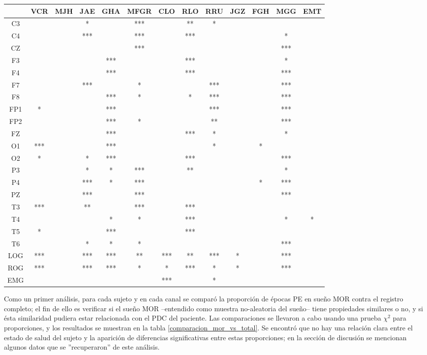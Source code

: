 \begin{SidewaysFigure}
\centering
\begin{tabular}{c||ccccc||cccc||ccc}
&VCR&MJH&JAE&GHA&MFGR&CLO&RLO&RRU&JGZ&FGH&MGG&EMT \\
\hline
C3& & &*& &***& &**&*& & & &  \\
C4& & &***& &***& &***& & & &*&  \\
CZ& & & & &***& & & & & &***&  \\
F3& & & &***& & &***& & & &*&  \\
F4& & & &***& & &***& & & &***&  \\
F7& & &***& &*& & &***& & &***&  \\
F8& & & &***&*& &*&***& & &***&  \\
FP1&*& & &***& & & &***& & &***&  \\
FP2& & & &***&*& & &**& & &***&  \\
FZ& & & &***& & &***&*& & &*&  \\
O1&***& & &***& & & &*& &*& &  \\
O2&*& &*&***& & &***& & & &***&  \\
P3& & &*&*&***& &**& & & &*&  \\
P4& & &***&*&***& & & & &*&***&  \\
PZ& & &***& &***& & & & & &***&  \\
T3&***& &**& &***& &***& & & & &  \\
T4& & & &*&*& &***& & & &*&* \\
T5&*& & &***& & &***& & & & &  \\
T6& & &*&*&*& & & & & &***&  \\
LOG&***& &***&***&**&***&**&***&*& &***&  \\
ROG&***& &***&***&*&*&***&*&*& &***&  \\
EMG& & & & & &***& &*& & & & 
\end{tabular}
\caption{Diferencias significativas para la comparaci\'on entre la proporci\'on
de \'epocas PE en sue\~no MOR (fase R) y no-MOR (fases W y N).
Los asteriscos representan el pvalor con el cual se rechaza la hip\'otesis de
que las diferencias son significativas: *=0.05 , **=0.01 , ***=0.005}
\label{comparacion_mor_vs_total}
\end{SidewaysFigure}

Como un primer an\'alisis, para cada sujeto y en cada canal 
se compar\'o la proporci\'on de \'epocas PE en sue\~no MOR contra el registro completo;
el fin de ello es verificar si el sue\~no MOR --entendido como muestra no-aleatoria
del sue\~no-- tiene propiedades similares o no, y si \'esta similaridad pudiera estar
relacionada con el PDC del paciente. 
Las comparaciones se llevaron a cabo usando una prueba $\chi^{2}$ para proporciones,
y los resultados se muestran en la tabla \ref{comparacion_mor_vs_total}.
Se encontr\'o que no hay una relaci\'on clara entre el estado de salud del sujeto y
la aparici\'on de diferencias significativas entre estas proporciones; en la secci\'on
de discusi\'on se mencionan algunos datos que se ''recuperaron'' de este an\'alisis.

